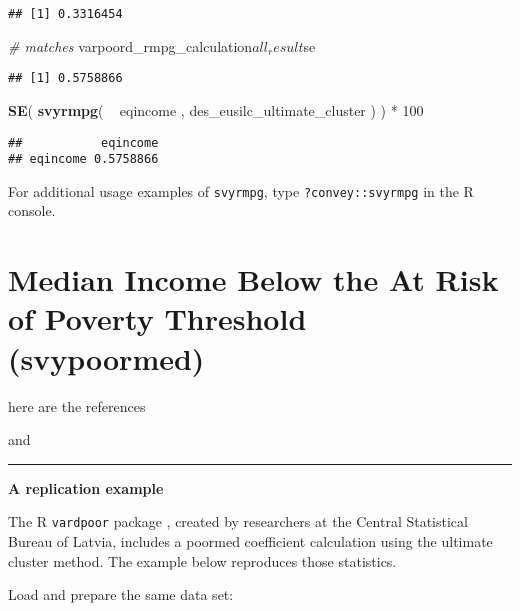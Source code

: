 \documentclass[]{book}
\newenvironment{Shaded}{\begin{snugshade}}{\end{snugshade}}
\newcommand{\KeywordTok}[1]{\textcolor[rgb]{0.13,0.29,0.53}{\textbf{{#1}}}}
\newcommand{\DecValTok}[1]{\textcolor[rgb]{0.00,0.00,0.81}{{#1}}}
\newcommand{\StringTok}[1]{\textcolor[rgb]{0.31,0.60,0.02}{{#1}}}
\newcommand{\CommentTok}[1]{\textcolor[rgb]{0.56,0.35,0.01}{\textit{{#1}}}}
\newcommand{\NormalTok}[1]{{#1}}
\theoremstyle{definition}
\theoremstyle{definition}
\theoremstyle{remark}
\begin{document}
\begin{verbatim}
## [1] 0.3316454
\end{verbatim}

\begin{Shaded}
\begin{Highlighting}[]
\CommentTok{# matches}
\NormalTok{varpoord_rmpg_calculation$all_result$se}
\end{Highlighting}
\end{Shaded}

\begin{verbatim}
## [1] 0.5758866
\end{verbatim}

\begin{Shaded}
\begin{Highlighting}[]
\KeywordTok{SE}\NormalTok{( }\KeywordTok{svyrmpg}\NormalTok{( ~}\StringTok{ }\NormalTok{eqincome , des_eusilc_ultimate_cluster ) ) *}\StringTok{ }\DecValTok{100}
\end{Highlighting}
\end{Shaded}

\begin{verbatim}
##           eqincome
## eqincome 0.5758866
\end{verbatim}

For additional usage examples of \texttt{svyrmpg}, type
\texttt{?convey::svyrmpg} in the R console.

\section{Median Income Below the At Risk of Poverty Threshold
(svypoormed)}\label{median-income-below-the-at-risk-of-poverty-threshold-svypoormed}

here are the references

\citep{osier2009} and \citep{deville1999}

\begin{center}\rule{0.5\linewidth}{\linethickness}\end{center}

\textbf{A replication example}

The R \texttt{vardpoor} package \citep{vardpoor}, created by researchers
at the Central Statistical Bureau of Latvia, includes a poormed
coefficient calculation using the ultimate cluster method. The example
below reproduces those statistics.

Load and prepare the same data set:
\end{document}
